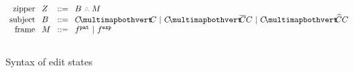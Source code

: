 \begin{figure}
  \vspace{-3px}
  \[
  \arraycolsep=4pt\begin{array}{rlrl}
    \text{zipper} & \zip & ::= & \zipper{\subject}{\zframe} \\
    \text{subject} & \subject & ::= &
      \pointing{\selection}{\selection} ~\vert~
      \selecting{\selection}{\selection}{\selection} ~\vert~
      \restructuring{\selection}{\selection}{\selection} \\
    \text{frame} & \zframe & ::= &
      \tfrelem^{\pat} ~\vert~
      \tfrelem^{\expr} \\\\


  \end{array}\]
  \caption{
    Syntax of edit states 
  }
  \label{fig:edit-state-syntax}
\end{figure}
